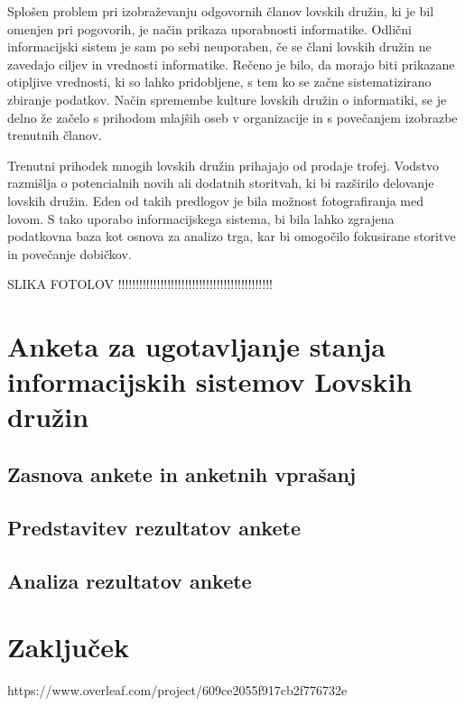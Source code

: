 \documentclass[a4paper,12pt,openright]{book}
\begin{document}
Splošen problem pri izobraževanju odgovornih članov lovskih družin, ki je bil omenjen pri pogovorih, je način prikaza uporabnosti informatike. 
Odlični informacijski sistem je sam po sebi neuporaben, če se člani lovskih družin ne zavedajo ciljev in vrednosti informatike. 
Rečeno je bilo, da morajo biti prikazane otipljive vrednosti, ki so lahko pridobljene, s tem ko se začne sistematizirano zbiranje podatkov. 
Način spremembe kulture lovskih družin o informatiki, se je delno že začelo s prihodom mlajših oseb v organizacije in s povečanjem izobrazbe trenutnih članov.

Trenutni prihodek mnogih lovskih družin prihajajo od prodaje trofej. 
Vodstvo razmišlja o potencialnih novih ali dodatnih storitvah, ki bi razširilo delovanje lovskih družin. 
Eden od takih predlogov je bila možnost fotografiranja med lovom. 
S tako uporabo informacijskega sistema, bi bila lahko zgrajena podatkovna baza kot osnova za analizo trga, kar bi omogočilo fokusirane storitve in povečanje dobičkov. 

SLIKA FOTOLOV !!!!!!!!!!!!!!!!!!!!!!!!!!!!!!!!!!!!!!!!!!!!

\chapter{Anketa za ugotavljanje stanja informacijskih sistemov Lovskih družin}
\label{stroka}

\section{Zasnova ankete in anketnih vprašanj}

\section{Predstavitev rezultatov ankete}

\section{Analiza rezultatov ankete}


\chapter{Zaključek}  %
\label{end}



\printbibliography[heading=bibintoc,type=article,title={Članki v revijah}]
https://www.overleaf.com/project/609ce2055f917cb2f776732e
\printbibliography[heading=bibintoc,type=inproceedings,title={Članki v zbornikih}]

\printbibliography[heading=bibintoc,type=incollection,title={Poglavja v knjigah}]

\printbibliography[heading=bibintoc,title={Celotna literatura}]
\end{document}
